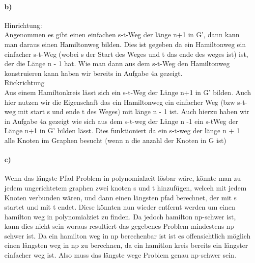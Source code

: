 \documentclass[a4paper]{article}
\begin{document}
\paragraph{b)}
Hinrichtung: \\
Angenommen es gibt einen einfachen s-t-Weg der länge n+1 in G', dann kann 
man daraus einen Hamiltonweg bilden. Dies ist gegeben da ein Hamiltonweg 
ein einfacher s-t-Weg (wobei s der Start des Weges und t das ende des weges ist)
ist, der die Länge n - 1 hat. Wie man dann aus dem 
s-t-Weg den Hamiltonweg konstruieren kann haben wir bereits in Aufgabe 4a 
gezeigt. \\
Rückrichtung \\
Aus einem Hamiltonkreis lässt sich ein s-t-Weg der Länge n+1 in G' bilden.
Auch hier nutzen wir die Eigenschaft das ein Hamiltonweg ein einfacher Weg
(bzw s-t-weg mit start s und ende t des Weges) mit länge n - 1 ist. Auch 
hierzu haben wir in Aufgabe 4a gezeigt wie sich aus dem s-t-weg der Länge 
n -1 ein s-tWeg der Länge n+1 in G' bilden lässt. 
Dies funktioniert da ein s-t-weg der länge n + 1 alle Knoten im Graphen 
besucht (wenn n die anzahl der Knoten in G ist)
\paragraph{c)}
Wenn das längste Pfad Problem in polynomialzeit lösbar wäre, könnte man zu jedem
ungerichtetem graphen zwei knoten s und t hinzufügen, welceh mit jedem Knoten
verbunden wären, und dann einen längsten pfad berechnet, der mit s startet 
und mit t endet. Diese könnten nun wieder entfernt werden um einen hamilton 
weg in polynomialziet zu finden. Da jedoch hamilton np-schwer ist, kann dies 
nicht sein woraus resultiert das gegebenes Problem mindestens np schwer ist.
Da ein hamilton weg in np berechenbar ist ist es offensichtlich möglich einen 
längsten weg in np zu berechnen, da ein hamitlon kreis bereits ein längster
einfacher weg ist. Also muss das längste wege Problem genau np-schwer sein.
\end{document}
